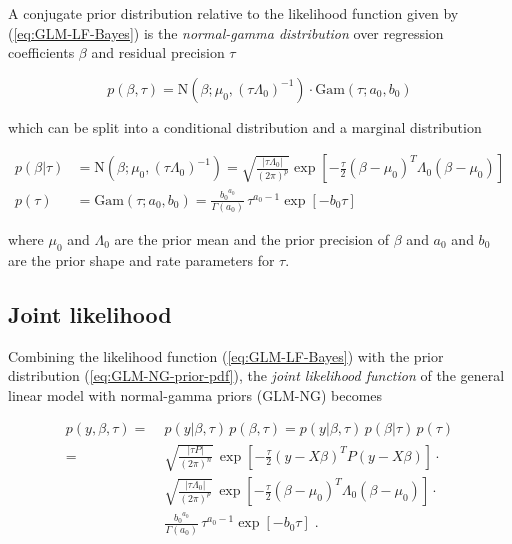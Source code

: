 A conjugate prior distribution relative to the likelihood function given by (\ref{eq:GLM-LF-Bayes}) is the \textit{normal-gamma distribution} over regression coefficients $\beta$ and residual precision $\tau$

\begin{equation} \label{eq:GLM-NG-prior}
p(\beta,\tau) = \mathrm{N}(\beta; \mu_0, (\tau \Lambda_0)^{-1}) \cdot \mathrm{Gam}(\tau; a_0, b_0)
\end{equation}

which can be split into a conditional distribution and a marginal distribution

\vspace{-0.5em}
\begin{equation} \label{eq:GLM-NG-prior-pdf}
\begin{split}
p(\beta|\tau) &= \mathrm{N}(\beta; \mu_0, (\tau \Lambda_0)^{-1}) = \sqrt{\frac{|\tau \Lambda_0|}{(2 \pi)^p}} \exp\left[ -\frac{\tau}{2} (\beta-\mu_0)^T \Lambda_0 (\beta-\mu_0) \right] \\
p(\tau) &= \mathrm{Gam}(\tau; a_0, b_0) = \frac{{b_0}^{a_0}}{\Gamma(a_0)} \, \tau^{a_0-1} \exp[-b_0 \tau]
\end{split}
\end{equation}

where $\mu_0$ and $\Lambda_0$ are the prior mean and the prior precision of $\beta$ and $a_0$ and $b_0$ are the prior shape and rate parameters for $\tau$.


\subsection{Joint likelihood} \label{sec:GLM-NG-JL}

Combining the likelihood function (\ref{eq:GLM-LF-Bayes}) with the prior distribution (\ref{eq:GLM-NG-prior-pdf}), the \textit{joint likelihood function} of the general linear model with normal-gamma priors (GLM-NG) becomes

\vspace{-0.5em}
\begin{equation} \label{eq:GLM-NG-JL1}
\begin{split}
p(y,\beta,\tau) = \; & p(y|\beta,\tau) \, p(\beta,\tau) = p(y|\beta,\tau) \, p(\beta|\tau) \, p(\tau) \\
= \; & \sqrt{\frac{|\tau P|}{(2 \pi)^n}} \, \exp\left[ -\frac{\tau}{2} (y-X\beta)^T P (y-X\beta) \right] \cdot \\
& \sqrt{\frac{|\tau \Lambda_0|}{(2 \pi)^p}} \, \exp\left[ -\frac{\tau}{2} (\beta-\mu_0)^T \Lambda_0 (\beta-\mu_0) \right] \cdot \\
& \frac{{b_0}^{a_0}}{\Gamma(a_0)} \, \tau^{a_0-1} \exp[-b_0 \tau] \; .
\end{split}
\end{equation}

